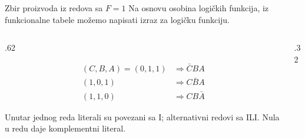 \begin{frame}[label=02-s013]{Zbir proizvoda iz redova sa \(F=1\)}
Na osnovu osobina logičkih funkcija, iz funkcionalne tabele možemo napisati izraz za logičku funkciju.\par\vspace{2mm}
\begin{columns}[T,onlytextwidth]
\begin{column}{.62\textwidth}

\[\begin{aligned}
(C,B,A)=(0,1,1)&\Rightarrow\bar CBA\\[2mm]
(1,0,1)&\Rightarrow C\bar BA\\[2mm]
(1,1,0)&\Rightarrow CB\bar A
\end{aligned}\]
\par\vspace{2mm}
\vspace{2mm}
Unutar jednog reda literali su povezani sa \alert{I}; alternativni redovi sa \alert{ILI}. Nula u redu daje komplementni literal.
\par\vspace{3mm}
\Rezultat{\(\textcolor{DEcrvena}{F=\bar CBA+C\bar BA+CB\bar A}\)}
\end{column}
\begin{column}{.32\textwidth}\centering
{}\vspace{3mm}
{\fontsize{9}{11}\selectfont }
\end{column}
\end{columns}
\end{frame}
